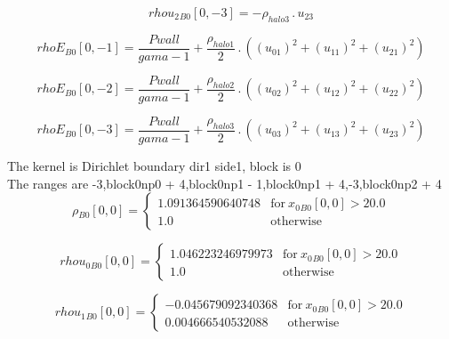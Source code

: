 \documentclass{article}
\begin{document}
\begin{dmath}{rhou_{2}{_{B0}}}[{0,-3}] = - \rho_{halo 3} \,.\, u_{23}\end{dmath}

\begin{dmath}{rhoE{_{B0}}}[{0,-1}] = \frac{Pwall}{gama - 1} + \frac{\rho_{halo 1}}{2} \,.\, \left(\left(u_{01} \right)^{2} + \left(u_{11} \right)^{2} + \left(u_{21} \right)^{2}\right)\end{dmath}

\begin{dmath}{rhoE{_{B0}}}[{0,-2}] = \frac{Pwall}{gama - 1} + \frac{\rho_{halo 2}}{2} \,.\, \left(\left(u_{02} \right)^{2} + \left(u_{12} \right)^{2} + \left(u_{22} \right)^{2}\right)\end{dmath}

\begin{dmath}{rhoE{_{B0}}}[{0,-3}] = \frac{Pwall}{gama - 1} + \frac{\rho_{halo 3}}{2} \,.\, \left(\left(u_{03} \right)^{2} + \left(u_{13} \right)^{2} + \left(u_{23} \right)^{2}\right)\end{dmath}

\noindent The kernel is Dirichlet boundary dir1 side1, block is 0\\\noindent The ranges are -3,block0np0 + 4,block0np1 - 1,block0np1 + 4,-3,block0np2 + 4\\\begin{dmath}{\rho{_{B0}}}[{0,0}] = \begin{cases} 1.091364590640748 & \text{for}\: {x_{0}{_{B0}}}[{0,0}] > 20.0 \\1.0 & \text{otherwise} \end{cases}\end{dmath}

\begin{dmath}{rhou_{0}{_{B0}}}[{0,0}] = \begin{cases} 1.046223246979973 & \text{for}\: {x_{0}{_{B0}}}[{0,0}] > 20.0 \\1.0 & \text{otherwise} \end{cases}\end{dmath}

\begin{dmath}{rhou_{1}{_{B0}}}[{0,0}] = \begin{cases} -0.045679092340368 & \text{for}\: {x_{0}{_{B0}}}[{0,0}] > 20.0 \\0.004666540532088 & \text{otherwise} \end{cases}\end{dmath}
\end{document}
